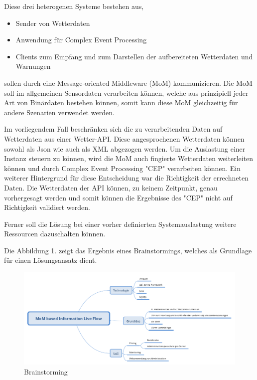 \documentclass[paper,oneside,onecolumn,notitlepage,bibtotocnumbered,fontsize=12pt,bigheadings,ngerman]{scrartcl}
\begin{document}
Diese drei heterogenen Systeme bestehen aus,
\begin{itemize}
\item Sender von Wetterdaten
\item Anwendung für Complex Event Processing
\item Clients zum Empfang und zum Darstellen der aufbereiteten Wetterdaten und Warnungen
\end{itemize}
sollen durch eine Message-oriented Middleware (MoM) kommunizieren. Die MoM soll im allgemeinen Sensordaten verarbeiten können, welche 
aus prinzipiell jeder Art von Binärdaten bestehen können, somit kann diese MoM gleichzeitig für andere Szenarien verwendet werden. 

Im vorliegendem Fall beschränken sich die zu verarbeitenden Daten auf Wetterdaten aus einer Wetter-API. Diese angesprochenen Wetterdaten können sowohl als Json wie auch als XML abgezogen werden. Um die Auslastung einer Instanz steuern zu können, wird die MoM auch fingierte Wetterdaten weiterleiten können und durch Complex Event Processing "CEP" verarbeiten können. Ein weiterer Hintergrund für diese Entscheidung war die Richtigkeit der errechneten Daten. Die Wetterdaten der API können, zu keinem Zeitpunkt, genau vorhergesagt werden und somit können die Ergebnisse des "CEP" nicht auf Richtigkeit validiert werden. 

Ferner soll die Lösung bei einer vorher definierten Systemauslastung weitere Ressourcen dazuschalten können. 

Die Abbildung 1.  zeigt das Ergebnis eines Brainstormings, welches als Grundlage für einen Lösungsansatz dient.

\begin{figure}[!ht]
\centering
\includegraphics[width=450pt]{MoM based Information Live Flow.png}
\caption{Brainstorming}
\end{figure}
\end{document}
